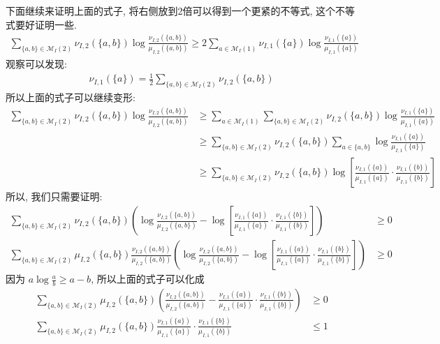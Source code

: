 \documentclass{article}
\begin{document}
下面继续来证明上面的式子, 将右侧放到2倍可以得到一个更紧的不等式, 这个不等式要好证明一些.
\begin{align*}
  \sum_{\{a,b\}\in\mathcal{M}_I(2)} \nu_{I, 2}(\{a,b\}) \log \frac{\nu_{I,2}(\{a,b\})}{\mu_{I,2}(\{a,b\})} \geq 2\sum_{a\in\mathcal{M}_I(1)}  \nu_{I,1}(\{a\}) \log \frac{\nu_{I,1}(\{a\})}{\mu_{I,1}(\{a\})} 
\end{align*}
观察可以发现:
\begin{align*}
  \nu_{I,1}(\{a\}) = \frac{1}{2}\sum_{\{a,b\}\in\mathcal{M}_I(2)} \nu_{I,2}(\{a,b\})
\end{align*}
所以上面的式子可以继续变形:
\begin{align*}
  \sum_{\{a,b\}\in\mathcal{M}_I(2)} \nu_{I, 2}(\{a,b\}) \log \frac{\nu_{I,2}(\{a,b\})}{\mu_{I,2}(\{a,b\})} &\geq \sum_{a\in\mathcal{M}_I(1)} \sum_{\{a,b\}\in\mathcal{M}_I(2)} \nu_{I,2}(\{a, b\}) \log \frac{\nu_{I,1}(\{a\})}{\mu_{I,1}(\{a\})} \\
  &\geq \sum_{\{a,b\}\in\mathcal{M}_I(2)}    \nu_{I,2}(\{a, b\})\sum_{a\in\{a,b\}}  \log \frac{\nu_{I,1}(\{a\})}{\mu_{I,1}(\{a\})} \\
  &\geq \sum_{\{a,b\}\in\mathcal{M}_I(2)} \nu_{I,2}(\{a, b\})\log\left[\frac{\nu_{I,1}(\{a\})}{\mu_{I,1}(\{a\})}\cdot\frac{\nu_{I,1}(\{b\})}{\mu_{I,1}(\{b\})}\right]
\end{align*}
所以, 我们只需要证明:
\begin{align*}
  \sum_{\{a,b\}\in\mathcal{M}_I(2)}\nu_{I,2}(\{a,b\}) \left(\log \frac{\nu_{I,2}(\{a,b\})}{\mu_{I,2}(\{a,b\})} - \log\left[\frac{\nu_{I,1}(\{a\})}{\mu_{I,1}(\{a\})}\cdot\frac{\nu_{I,1}(\{b\})}{\mu_{I,1}(\{b\})}\right]\right) &\geq 0\\
  \sum_{\{a,b\}\in\mathcal{M}_I(2)} \mu_{I,2}(\{a,b\}) \frac{\nu_{I,2}(\{a,b\})}{\mu_{I,2}(\{a,b\})} \left(\log \frac{\nu_{I,2}(\{a,b\})}{\mu_{I,2}(\{a,b\})} - \log\left[\frac{\nu_{I,1}(\{a\})}{\mu_{I,1}(\{a\})}\cdot\frac{\nu_{I,1}(\{b\})}{\mu_{I,1}(\{b\})}\right]\right) &\geq 0
\end{align*}
因为 $a\log\frac{a}{b} \geq a - b$, 所以上面的式子可以化成
\begin{align*}
  \sum_{\{a,b\}\in\mathcal{M}_I(2)} \mu_{I,2}(\{a,b\}) \left(\frac{\nu_{I,2}(\{a,b\})}{\mu_{I,2}(\{a,b\})} - \frac{\nu_{I,1}(\{a\})}{\mu_{I,1}(\{a\})}\cdot\frac{\nu_{I,1}(\{b\})}{\mu_{I,1}(\{b\})} \right) &\geq 0\\
  \sum_{\{a,b\}\in\mathcal{M}_I(2)} \mu_{I,2}(\{a,b\})\frac{\nu_{I,1}(\{a\})}{\mu_{I,1}(\{a\})}\cdot\frac{\nu_{I,1}(\{b\})}{\mu_{I,1}(\{b\})} &\leq 1
\end{align*}
\end{document}
